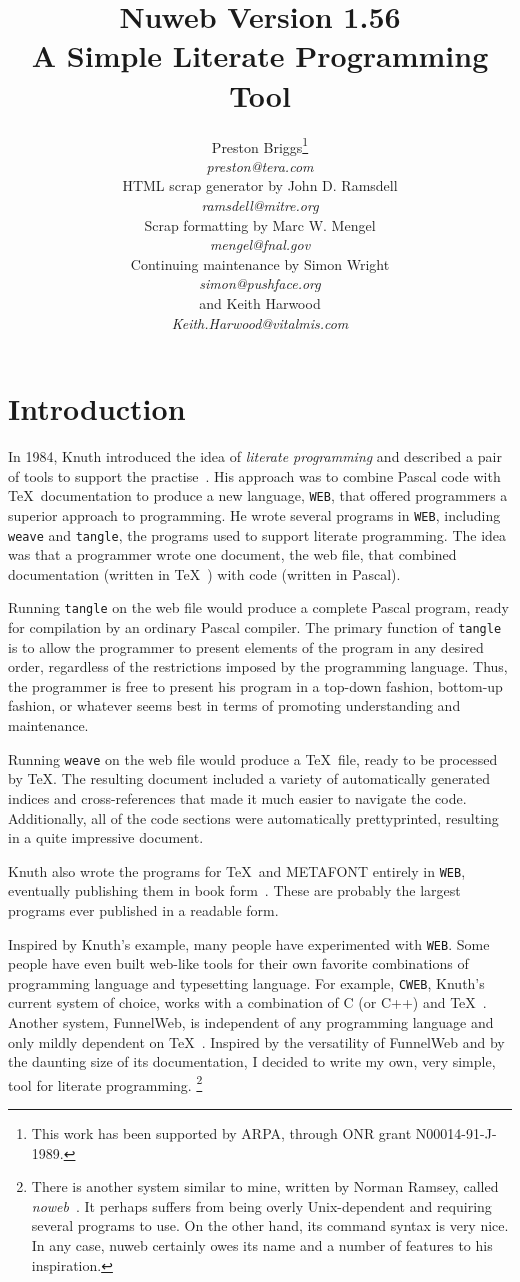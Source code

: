 \documentclass[a4paper]{report}
\title{Nuweb Version 1.56 \\ A Simple Literate Programming Tool}
\date{}
\author{Preston Briggs\thanks{This work has been supported by ARPA,
through ONR grant N00014-91-J-1989.}
\\ {\sl preston@tera.com}
\\ HTML scrap generator by John D. Ramsdell
\\ {\sl ramsdell@mitre.org}
\\ Scrap formatting by Marc W. Mengel
\\ {\sl mengel@fnal.gov}
\\ Continuing maintenance by Simon Wright
\\ {\sl simon@pushface.org}
\\ and Keith Harwood
\\ {\sl Keith.Harwood@vitalmis.com}}
\begin{document}
\maketitle
\tableofcontents

\chapter{Introduction}

In 1984, Knuth introduced the idea of {\em literate programming\/} and
described a pair of tools to support the practise~\cite{Knuth:CJ-27-2-97}.
His approach was to combine Pascal code with \TeX\ documentation to
produce a new language, \verb|WEB|, that offered programmers a superior
approach to programming. He wrote several programs in \verb|WEB|,
including \verb|weave| and \verb|tangle|, the programs used to support
literate programming.
The idea was that a programmer wrote one document, the web file, that
combined documentation (written in \TeX~\cite{Knuth:ct-a}) with code
(written in Pascal).

Running \verb|tangle| on the web file would produce a complete
Pascal program, ready for compilation by an ordinary Pascal compiler.
The primary function of \verb|tangle| is to allow the programmer to
present elements of the program in any desired order, regardless of
the restrictions imposed by the programming language. Thus, the
programmer is free to present his program in a top-down fashion,
bottom-up fashion, or whatever seems best in terms of promoting
understanding and maintenance.

Running \verb|weave| on the web file would produce a \TeX\ file, ready
to be processed by \TeX\@. The resulting document included a variety of
automatically generated indices and cross-references that made it much
easier to navigate the code. Additionally, all of the code sections
were automatically prettyprinted, resulting in a quite impressive
document.

Knuth also wrote the programs for \TeX\ and {\small\sf METAFONT}
entirely in \verb|WEB|, eventually publishing them in book
form~\cite{Knuth:ct-b,Knuth:ct-d}. These are probably the
largest programs ever published in a readable form.

Inspired by Knuth's example, many people have experimented with
\verb|WEB|\@. Some people have even built web-like tools for their
own favorite combinations of programming language and typesetting
language. For example, \verb|CWEB|, Knuth's current system of choice,
works with a combination of C (or C++) and \TeX~\cite{Levy:TB8-1-12}.
Another system, FunnelWeb, is independent of any programming language
and only mildly dependent on \TeX~\cite{Williams:FUM92}. Inspired by the
versatility of FunnelWeb and by the daunting size of its
documentation, I decided to write my own, very simple, tool for
literate programming.%
\footnote{There is another system similar to
mine, written by Norman Ramsey, called {\em noweb}~\cite{Ramsey:LPT92}. It
perhaps suffers from being overly Unix-dependent and requiring several
programs to use. On the other hand, its command syntax is very nice.
In any case, nuweb certainly owes its name and a number of features to
his inspiration.}
\end{document}
